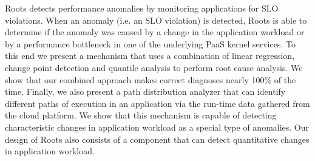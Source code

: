 Roots detects performance anomalies by monitoring applications for SLO violations. 
When an anomaly (i.e. an SLO violation) is detected, Roots is able to determine if
the anomaly was caused by a change in the application workload or by a performance 
bottleneck in one of the underlying PaaS kernel services. To this end we present a mechanism
that uses a combination of linear regression, change point detection and quantile analysis to
perform root cause analysis. We show that our combined approach makes correct diagnoses nearly
100\% of the time. Finally, we also present a path distribution analyzer that can identify different
paths of execution in an application via the run-time data gathered from the cloud platform.
We show that this mechanism is capable of detecting characteristic changes in application
workload as a special type of anomalies. Our design of Roots also consists of a component
that can detect quantitative changes in application workload.